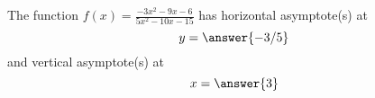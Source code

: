 \documentclass{ximera}
\author{Gregory Hartman \and Matthew Carr}
\begin{document}
\begin{exercise}





The function $f(x)=\frac{-3x^2-9x-6}{5x^2-10x-15}$ has horizontal
asymptote(s) at
\[
y=\answer{-3/5}
\]
and vertical asymptote(s) at
\[
x= \answer{3}
\]

\end{exercise}
\end{document}

